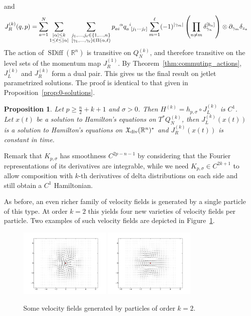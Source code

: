 \documentclass[12pt]{amsart}
\newcommand{\R}{\ensuremath{\mathbb{R}}}
\newtheorem{prop}[thm]{Proposition}
\DeclareMathOperator{\SDiff}{SDiff}
\begin{document}
  and
  \begin{equation*}
    J_R^{(k)}(q,p) = \sum_{a=1}^{N}
    \sum_{\substack{ |\alpha| \leq k \\ 1 \leq \ell \leq |\alpha| }} \;
		\sum_{
			\substack{
				j_1,\dots,j_\ell \in \{1,\dots,n\} \\
				[\gamma_1,\dots,\gamma_\ell] \in \Pi(\alpha,\ell)
				}
			}
			p\indices{_a_i^\alpha} q\indices{_a^i_{[j_1 \cdots j_\ell]}}
      \sum_{m=1}^\ell (-1)^{|\gamma_m|}\left( \prod_{n \neq m}  \delta_{\gamma_n}^{[b_n]} \right) \otimes \partial_{\gamma_m}\delta_{z_a}
  \end{equation*}
  The action of $\SDiff(\R^n)$ is transitive on $Q_N^{(k)}$, and
  therefore transitive on the level sets of the momentum map $J_R^{(1)}$.
  By Theorem~\ref{thm:commuting_actions}, $J_L^{(k)}$ and $J_R^{(k)}$ form a dual pair.
  This gives us the final result on jetlet parametrized solutions.
  The proof is identical to that given in Proposition~\ref{prop:0-solutions}.
  \begin{prop}\label{prop:k-solutions}
    Let $p \ge \frac{n}{2} + k + 1$ and $\sigma > 0$.
    Then $H^{(k)} = h_{p,\sigma} \circ J_L^{(k)}$ is $C^1$.
    Let $x(t)$ be a solution to Hamilton's equations on
    $T^*Q^{(k)}_N$, then $J_L^{(k)}( x(t))$ is a solution to Hamilton's
    equations on $\mathfrak{X}_{\rm div}(\R^n)^*$
    and $J_R^{(k)}( x(t))$ is constant in time.
  \end{prop}
  Remark that $K_{p,\sigma}$ has smoothness $C^{2p-n-1}$ by considering
  that the Fourier representations of its derivatives are integrable,
  while we need $K_{p,\sigma} \in C^{2k+1}$ to allow composition with
  $k$-th derivatives of delta distributions on each side and still
  obtain a $C^1$ Hamiltonian.

  As before, an even richer family of velocity fields is generated by a single particle of this type.
  At order $k=2$ this yields four new varieties of velocity fields per particle.
  Two examples of such velocity fields are depicted in Figure~\ref{fig:2_jet}.
  
  \begin{figure}[h!]
  	\centering
	\includegraphics[width=0.4\textwidth]{two_jet_a_2D.pdf}
	\includegraphics[width=0.4\textwidth]{two_jet_b_2D.pdf}
	\caption{Some velocity fields generated by particles of order $k=2$.}
	\label{fig:2_jet}
  \end{figure}
  
\end{document}
